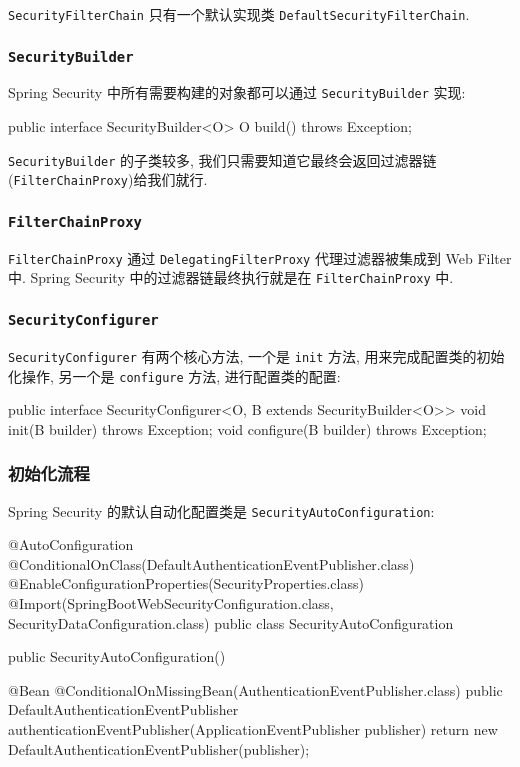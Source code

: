 \texttt{SecurityFilterChain} 只有一个默认实现类 \texttt{DefaultSecurityFilterChain}. 

\subsubsection*{\texttt{SecurityBuilder}}

Spring Security 中所有需要构建的对象都可以通过 \texttt{SecurityBuilder} 实现:

\begin{Java}
public interface SecurityBuilder<O> {
    O build() throws Exception;
}
\end{Java}

\texttt{SecurityBuilder} 的子类较多, 我们只需要知道它最终会返回过滤器链(\texttt{FilterChainProxy})给我们就行.

\subsubsection*{\texttt{FilterChainProxy}}

\texttt{FilterChainProxy} 通过 \texttt{DelegatingFilterProxy} 代理过滤器被集成到 Web Filter 中. Spring Security 中的过滤器链最终执行就是在 \texttt{FilterChainProxy} 中.

\subsubsection*{\texttt{SecurityConfigurer}}

\texttt{SecurityConfigurer} 有两个核心方法, 一个是 \texttt{init} 方法, 用来完成配置类的初始化操作, 另一个是 \texttt{configure} 方法, 进行配置类的配置:

\begin{Java}
public interface SecurityConfigurer<O, B extends SecurityBuilder<O>> {
    void init(B builder) throws Exception;
    void configure(B builder) throws Exception;
}
\end{Java}

\subsubsection*{初始化流程}

Spring Security 的默认自动化配置类是 \texttt{SecurityAutoConfiguration}:

\begin{Java}
@AutoConfiguration
@ConditionalOnClass({DefaultAuthenticationEventPublisher.class})
@EnableConfigurationProperties({SecurityProperties.class})
@Import({SpringBootWebSecurityConfiguration.class, SecurityDataConfiguration.class})
public class SecurityAutoConfiguration {
    public SecurityAutoConfiguration() {
    }

    @Bean
    @ConditionalOnMissingBean({AuthenticationEventPublisher.class})
    public DefaultAuthenticationEventPublisher authenticationEventPublisher(ApplicationEventPublisher publisher) {
        return new DefaultAuthenticationEventPublisher(publisher);
    }
}
\end{Java}

